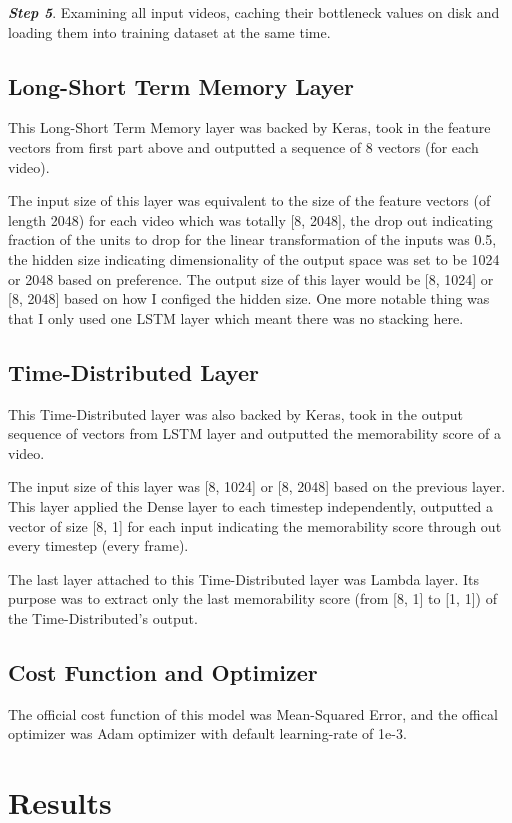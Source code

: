 \textbf{\emph{Step 5}}. Examining all input videos, caching their bottleneck values on disk and loading them into training dataset at the same time.

\subsection{Long-Short Term Memory Layer}
This Long-Short Term Memory layer was backed by Keras, took in the feature vectors from first part above and outputted a sequence of 8 vectors (for each video).

The input size of this layer was equivalent to the size of the feature vectors (of length 2048) for each video which was totally [8, 2048], the drop out indicating fraction of the units to drop for the linear transformation of the inputs was 0.5, the hidden size indicating dimensionality of the output space was set to be 1024 or 2048 based on preference. The output size of this layer would be [8, 1024] or [8, 2048] based on how I configed the hidden size. One more notable thing was that I only used one LSTM layer which meant there was no stacking here.

\subsection{Time-Distributed Layer}
This Time-Distributed layer was also backed by Keras, took in the output sequence of vectors from LSTM layer and outputted the memorability score of a video.

The input size of this layer was [8, 1024] or [8, 2048] based on the previous layer. This layer applied the Dense layer to each timestep independently, outputted a vector of size [8, 1] for each input indicating the memorability score through out every timestep (every frame).

The last layer attached to this Time-Distributed layer was Lambda layer. Its purpose was to extract only the last memorability score (from [8, 1] to [1, 1]) of the Time-Distributed's output.

\subsection{Cost Function and Optimizer}
The official cost function of this model was Mean-Squared Error, and the offical optimizer was Adam optimizer with default learning-rate of 1e-3.

\section{Results}


